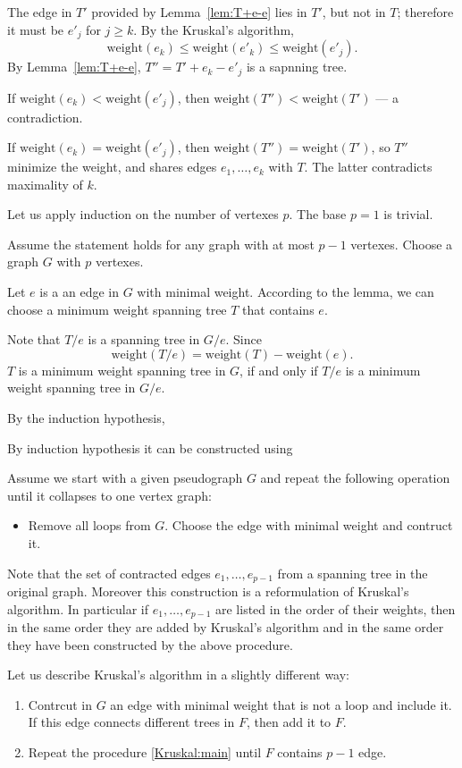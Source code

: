 The edge in $T'$ provided by Lemma~\ref{lem:T+e-e} lies in $T'$, but not in $T$;
therefore it must be $e'_j$ for $j\ge k$.
By the Kruskal’s algorithm,
\[\mathrm{weight}(e_k)\le \mathrm{weight}(e'_k)\le \mathrm{weight}(e'_j).\]
By Lemma~\ref{lem:T+e-e}, $T''=T'+e_k-e'_j$ is a sapnning tree.

If $\mathrm{weight}(e_k)< \mathrm{weight}(e'_j)$, then $\mathrm{weight}(T'')<\mathrm{weight}(T')$ --- a contradiction.

If $\mathrm{weight}(e_k)=\mathrm{weight}(e'_j)$, then $\mathrm{weight}(T'')=\mathrm{weight}(T')$, so $T''$ minimize the weight, and shares edges $e_1,\dots,e_k$ with $T$.
The latter contradicts maximality of $k$.
\qeds

Let us apply induction on the number of vertexes $p$.
The base $p=1$ is trivial.

Assume the statement holds for any graph with at most $p-1$ vertexes.
Choose a graph $G$ with $p$ vertexes.

Let $e$ is a an edge in $G$ with minimal weight.
According to the lemma, we can choose a minimum weight spanning tree $T$ that contains $e$.

Note that $T/e$ is a spanning tree in $G/e$.
Since 
\[\mathrm{weight}(T/e)=\mathrm{weight}(T)-\mathrm{weight}(e).\]
$T$ is a minimum weight spanning tree in $G$, if and only if  
$T/e$ is a minimum weight spanning tree in $G/e$.

By the induction hypothesis, 

By induction hypothesis it can be constructed using 

Assume we start with a given pseudograph $G$ and repeat the following operation until it collapses to one vertex graph:
\begin{itemize}
\item Remove all loops from $G$. Choose the edge with minimal weight and contruct it.
\end{itemize}
Note that the set of contracted edges $e_1,\dots,e_{p-1}$ from a spanning tree in the original graph.
Moreover this construction is a reformulation of Kruskal's algorithm.
In particular if $e_1,\dots,e_{p-1}$ are listed in the order of their weights,
then in the same order they are added by Kruskal’s algorithm and in the same order they have been constructed by the above procedure.




Let us describe Kruskal’s algorithm in a slightly different way:
\begin{enumerate}[1.]
\item Contrcut in $G$ an edge with minimal weight that is not a loop and include it.
If this edge connects different trees in $F$, then add it to $F$.
\item Repeat the procedure \ref{Kruskal:main} until $F$ contains $p-1$ edge.
\end{enumerate}

